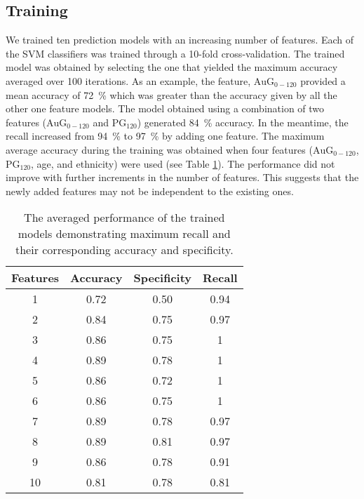 \documentclass[a4paper,twoside]{article}
\begin{document}
\subsection{Training} 
% 
We trained ten prediction models with an increasing number of features. Each of the SVM classifiers was trained through a 10-fold cross-validation. The trained model was obtained by selecting the one that yielded the maximum accuracy averaged over \num{100} iterations. As an example, the feature, $\textrm{AuG}_{0-120}$ provided a mean accuracy of \SI{72}{\percent} which was greater than the accuracy given by all the other one feature models. The model obtained using a combination of two features ($\textrm{AuG}_{0-120}$ and $\textrm{PG}_{120}$) generated \SI{84}{\percent} accuracy. In the meantime, the recall increased from \SI{94}{\percent} to \SI{97}{\percent} by adding one feature. The maximum average accuracy during the training was obtained when four features ($\textrm{AuG}_{0-120}$, $\textrm{PG}_{120}$, age, and ethnicity) were used (see Table \ref{tab:train_perf}). The performance did not improve with further increments in the number of features. This suggests that the newly added features may not be independent to the existing ones.
%
\begin{table}[!htbp]
%
\centering
\begin{tabular}{c c c c}
\toprule
Features &  Accuracy & Specificity & Recall\\
\midrule \midrule
	1	& \num{0.72}	& \num{0.50}	& \num{0.94}	\\	
	2	& \num{0.84}	& \num{0.75}    & \num{0.97}	\\	
	3	& \num{0.86}	& \num{0.75}    & \num{1}		\\
	4	& \num{0.89}	& \num{0.78}	& \num{1}		\\	
	5	& \num{0.86}	& \num{0.72}	& \num{1}		\\	
	6	& \num{0.86}	& \num{0.75}	& \num{1}		\\
	7	& \num{0.89}	& \num{0.78}	& \num{0.97}    \\		
	8	& \num{0.89}	& \num{0.81}	& \num{0.97}	\\		
	9	& \num{0.86}	& \num{0.78}	& \num{0.91}	\\		
	10	& \num{0.81}	& \num{0.78}	& \num{0.81}	\\	
\bottomrule
\end{tabular}
\caption{The averaged performance of the trained models demonstrating maximum recall and their corresponding accuracy and specificity.}
\label{tab:train_perf}
\end{table}
%
\end{document}

